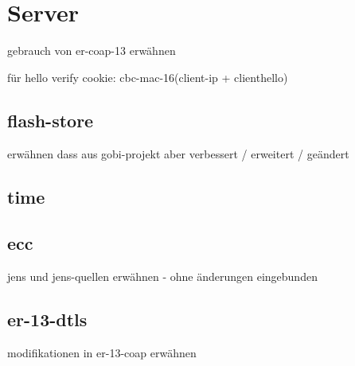 \section{Server}
gebrauch von er-coap-13 erwähnen

für hello verify cookie: cbc-mac-16(client-ip + clienthello)

\subsection{flash-store}
erwähnen dass aus gobi-projekt aber verbessert / erweitert / geändert

\subsection{time}

\subsection{ecc}
jens und jens-quellen erwähnen - ohne änderungen eingebunden

\subsection{er-13-dtls}
modifikationen in er-13-coap erwähnen